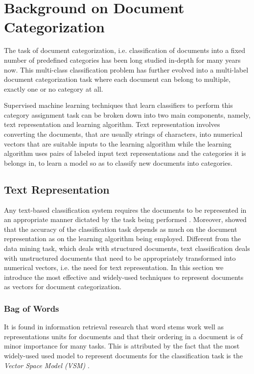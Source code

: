 \chapter{Background on Document Categorization}
\label{chapter:relatedwork}
The task of document categorization, i.e. classification of documents into a fixed number of predefined categories has been long studied in-depth for many years now. This multi-class classification problem has further evolved into a multi-label document categorization task where each document can belong to multiple, exactly one or no category at all. 

Supervised machine learning techniques that learn classifiers to perform this category assignment task can be broken down into two main components, namely, text representation and learning algorithm. 
Text representation involves converting the documents, that are usually strings of characters, into numerical vectors that are suitable inputs to the learning algorithm while the learning algorithm uses pairs of labeled input text representations and the categories it is belongs in, to learn a model so as to classify new documents into categories.

\section{Text Representation}
\label{sec:textrepr}
Any text-based classification system requires the documents to be represented in an appropriate manner dictated by the task being performed \citep{lewis1992text}. Moreover, \cite{quinlan1983learning} showed that the accuracy of the classification task depends as much on the document representation as on the learning algorithm being employed. Different from the data mining task, which deals with structured documents, text classification deals with unstructured documents that need to be appropriately transformed into numerical vectors, i.e. the need for text representation. In this section we introduce the most effective and widely-used techniques to represent documents as vectors for document categorization.

\subsection{Bag of Words}
It is found in information retrieval research that word stems work well as representations units for documents and that their ordering in a document is of minor importance for many tasks. This is attributed by the fact that the most widely-used used model to represent documents for the classification task is the \emph{Vector Space Model (VSM)} \citep{salton1973specification}. 

